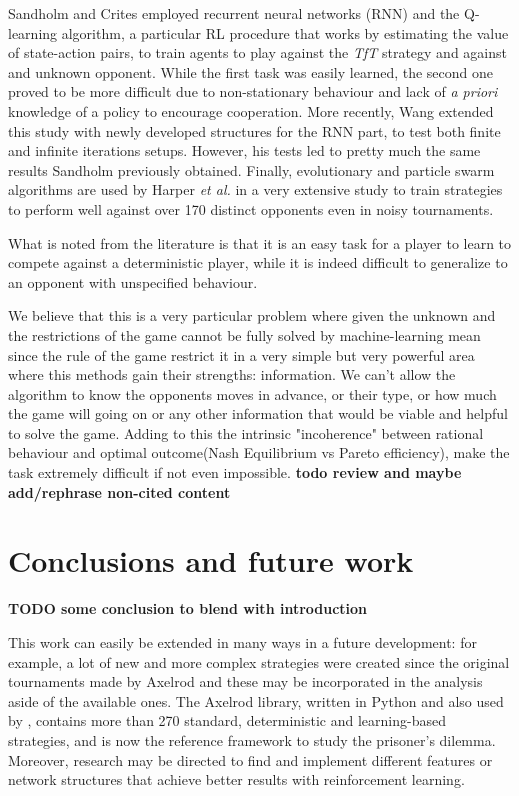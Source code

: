 \documentclass[journal,a4paper,10pt,twoside]{IEEEtran} %
\begin{document}
Sandholm and Crites \cite{sandholmRL} employed recurrent neural networks (RNN) and the Q-learning algorithm, a particular RL procedure that works by estimating the value of state-action pairs, to train agents to play against the \textit{TfT} strategy and against and unknown opponent. While the first task was easily learned, the second one proved to be more difficult due to non-stationary behaviour and lack of \textit{a priori} knowledge of a policy to encourage cooperation.
More recently, Wang \cite{kedaoRL} extended this study with newly developed structures for the RNN part, to test both finite and infinite iterations setups. However, his tests led to pretty much the same results Sandholm previously obtained.
Finally, evolutionary and particle swarm algorithms are used by Harper \textit{et al.} in a very extensive study \cite{plosRLdominant} to train strategies to perform well against over 170 distinct opponents even in noisy tournaments.

What is noted from the literature is that it is an easy task for a player to learn to compete against a deterministic player, while it is indeed difficult to generalize to an opponent with unspecified behaviour.

We believe that this is a very particular problem where given the unknown and the restrictions of the game cannot be fully solved by machine-learning mean since the rule of the game restrict it in a very simple but very powerful area where this methods gain their strengths: information. We can't allow the algorithm to know the opponents moves in advance, or their type, or how much the game will going on or any other information that would be viable and helpful to solve the game. Adding to this the intrinsic "incoherence" between rational behaviour and optimal outcome(Nash Equilibrium vs Pareto efficiency), make the task extremely difficult if not even impossible.
\textbf{todo review and maybe add/rephrase non-cited content}

\section{Conclusions and future work} \label{s:conc}
\textbf{TODO some conclusion to blend with introduction}

This work can easily be extended in many ways in a future development: for example, a lot of new and more complex strategies were created since the original tournaments made by Axelrod and these may be incorporated in the analysis aside of the available ones.
The Axelrod library, \cite{Knight2016Axel,axel-lib} written in Python and also used by \cite{plosRLdominant}, contains more than 270 standard, deterministic and learning-based strategies, and is now the reference framework to study the prisoner's dilemma.
Moreover, research may be directed to find and implement different features or network structures that achieve better results with reinforcement learning.
\end{document}
